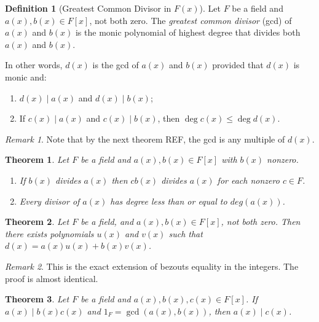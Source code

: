 \documentclass{article}
\newtheorem{theorem}{Theorem}[section]
\theoremstyle{definition}
\newtheorem{definition}{Definition}[section]
\theoremstyle{remark}
\newtheorem{remark}{Remark}[section]
\begin{document}
\begin{definition}[Greatest Common Divisor in $F(x)$]
Let $F$ be a field and $a(x), b(x) \in F[x]$, not both zero. The \textit{greatest common divisor} (gcd) of $a(x)$ and $b(x)$ is the monic polynomial of highest degree that divides both $a(x)$ and $b(x)$. 

In other words, $d(x)$ is the gcd of $a(x)$ and $b(x)$ provided that $d(x)$ is monic and:
\begin{enumerate}
\item $d(x) \mid a(x)$ and $d(x) \mid b(x)$;
\item If $c(x) \mid a(x)$ and $c(x) \mid b(x)$, then $\deg c(x) \leq \deg d(x)$.
\end{enumerate}
\end{definition}
\begin{remark}
Note that by the next theorem REF, the gcd is any multiple of $d(x)$.
\end{remark}



\begin{theorem}
Let $F$ be a field and $a(x), b(x) \in F[x]$ with $b(x)$ nonzero.
\begin{enumerate}
    \item If $b(x)$ divides $a(x)$ then $cb(x)$ divides $a(x)$ for each nonzero $c \in F$.
    \item Every divisor of $a(x)$ has degree less than or equal to $deg(a(x))$.
\end{enumerate}
\end{theorem}



\begin{theorem}
Let $F$ be a field, and $a(x),b(x)\in F[x]$, not both zero. Then there
exists polynomials $u(x)$ and $v(x)$ such that $d(x) = a(x)u(x) + b(x)v(x)$.
\end{theorem}
\begin{remark}
This is the exact extension of bezouts equality in the integers. The proof is almost identical. 
\end{remark}



\begin{theorem} \label{thm:relatively prime divisibility}
Let $F$ be a field and $a(x), b(x), c(x) \in F[x]$. If $a(x) \mid b(x)c(x)$ and $1_F = \gcd(a(x), b(x))$, then $a(x) \mid c(x)$.
\end{theorem}
\end{document}
